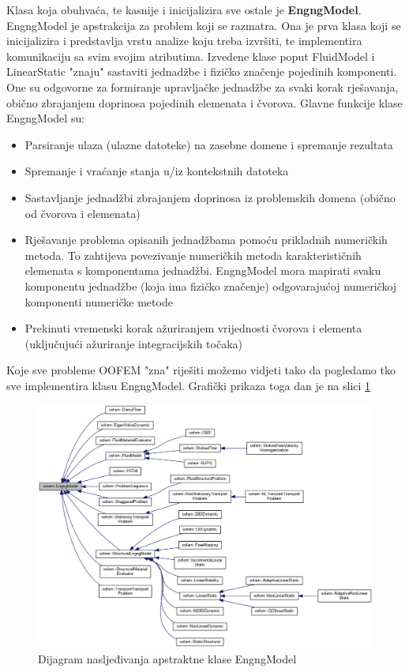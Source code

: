 \documentclass[a4paper,twoside,12pt]{memoir} %
\begin{document}
Klasa koja obuhvaća, te kasnije i inicijalizira sve ostale je \textbf{EngngModel}. EngngModel je apstrakcija za problem koji se razmatra. Ona je prva klasa koji se inicijalizira i predstavlja vrstu analize koju treba izvršiti, te implementira komunikaciju sa svim svojim atributima. Izvedene klase poput FluidModel i LinearStatic "znaju" sastaviti jednadžbe i fizičko značenje pojedinih komponenti. One su odgovorne za formiranje upravljačke jednadžbe za svaki korak rješavanja, obično zbrajanjem doprinosa pojedinih elemenata i čvorova. Glavne funkcije klase EngngModel su:
\begin{itemize}
    \item Parsiranje ulaza (ulazne datoteke) na zasebne domene i spremanje rezultata
    \item Spremanje i vraćanje stanja u/iz kontekstnih datoteka
    \item Sastavljanje jednadžbi zbrajanjem doprinosa iz problemskih domena (obično od čvorova i elemenata)
    \item Rješavanje problema opisanih jednadžbama pomoću prikladnih numeričkih metoda. To zahtijeva povezivanje numeričkih metoda karakterističnih elemenata s komponentama jednadžbi. EngngModel mora mapirati svaku komponentu jednadžbe (koja ima fizičko značenje) odgovarajućoj numeričkoj komponenti numeričke metode
    \item Prekinuti vremenski korak ažuriranjem vrijednosti čvorova i elementa (uključujući ažuriranje integracijskih točaka)
\end{itemize}
Koje sve probleme OOFEM "zna" riješiti možemo vidjeti tako da pogledamo tko sve implementira klasu EngngModel. Grafički prikaza toga dan je na slici \ref{fig:engngModel_inheritance}

\begin{figure}[h!t]
\begin{center}
\includegraphics[scale=0.38]{pictures/chapter_oofem/EngngModel_inheritance.png}
\caption{Dijagram nasljeđivanja apstraktne klase EngngModel \cite{oofem_reference}}
\label{fig:engngModel_inheritance}
\end{center}
\end{figure}
\end{document}
